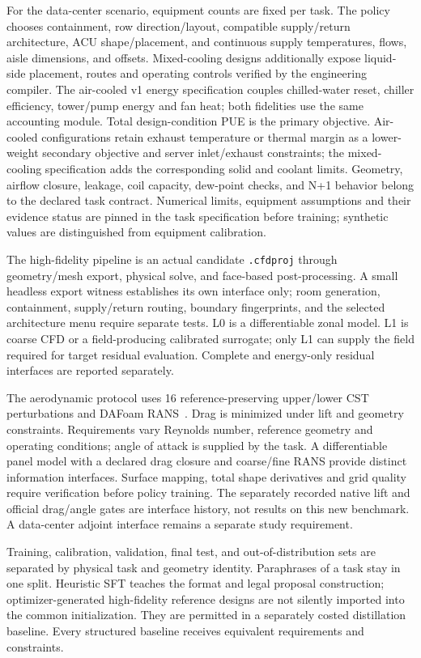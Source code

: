 For the data-center scenario, equipment counts are fixed per task. The policy chooses containment, row direction/layout, compatible supply/return architecture, ACU shape/placement, and continuous supply temperatures, flows, aisle dimensions, and offsets. Mixed-cooling designs additionally expose liquid-side placement, routes and operating controls verified by the engineering compiler. The air-cooled v1 energy specification couples chilled-water reset, chiller efficiency, tower/pump energy and fan heat; both fidelities use the same accounting module. Total design-condition PUE is the primary objective. Air-cooled configurations retain exhaust temperature or thermal margin as a lower-weight secondary objective and server inlet/exhaust constraints; the mixed-cooling specification adds the corresponding solid and coolant limits. Geometry, airflow closure, leakage, coil capacity, dew-point checks, and N+1 behavior belong to the declared task contract. Numerical limits, equipment assumptions and their evidence status are pinned in the task specification before training; synthetic values are distinguished from equipment calibration.

The high-fidelity pipeline is an actual candidate \texttt{.cfdproj} through geometry/mesh export, physical solve, and face-based post-processing. A small headless export witness establishes its own interface only; room generation, containment, supply/return routing, boundary fingerprints, and the selected architecture menu require separate tests. L0 is a differentiable zonal model. L1 is coarse CFD or a field-producing calibrated surrogate; only L1 can supply the field required for target residual evaluation. Complete and energy-only residual interfaces are reported separately.

The aerodynamic protocol uses 16 reference-preserving upper/lower CST perturbations and DAFoam RANS~\cite{he2020dafoam}. Drag is minimized under lift and geometry constraints. Requirements vary Reynolds number, reference geometry and operating conditions; angle of attack is supplied by the task. A differentiable panel model with a declared drag closure and coarse/fine RANS provide distinct information interfaces. Surface mapping, total shape derivatives and grid quality require verification before policy training. The separately recorded native lift and official drag/angle gates are interface history, not results on this new benchmark. A data-center adjoint interface remains a separate study requirement.

Training, calibration, validation, final test, and out-of-distribution sets are separated by physical task and geometry identity. Paraphrases of a task stay in one split. Heuristic SFT teaches the format and legal proposal construction; optimizer-generated high-fidelity reference designs are not silently imported into the common initialization. They are permitted in a separately costed distillation baseline. Every structured baseline receives equivalent requirements and constraints.



